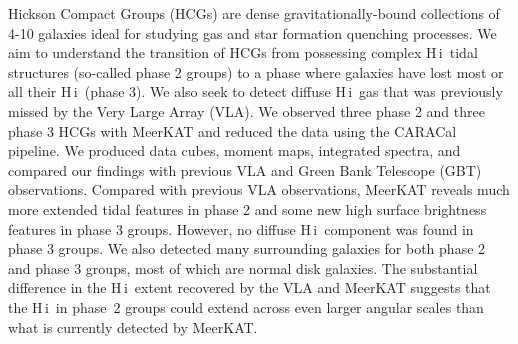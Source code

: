 \documentclass{aa}
\newcommand{\HI}{H\,{\sc i}}
\begin{document}
   \date{Received November 14, 2024; accepted December 16, 2024}

%
\abstract
{Hickson Compact Groups (HCGs) are dense gravitationally-bound collections of 4-10 galaxies ideal for studying gas and star formation quenching processes. }
{We aim to understand the transition of HCGs from possessing complex \HI\ tidal structures (so-called phase 2 groups) to a phase where galaxies have lost most or all their \HI\ (phase 3). We also seek to detect diffuse \HI\ gas that was previously missed by the Very Large Array (VLA).}
{We observed three phase 2 and three phase 3 HCGs with MeerKAT and reduced the data using the CARACal pipeline. We produced data cubes, moment maps, integrated spectra, and  compared our findings with previous VLA and Green Bank Telescope (GBT) observations.}
{Compared with previous VLA observations, MeerKAT reveals much more extended tidal features in phase 2 and some new high surface brightness features in phase 3 groups. However, no diffuse \HI\ component was found in phase 3 groups. We also detected many surrounding galaxies for both phase 2 and phase 3 groups, most of which are normal disk galaxies.}
{The substantial difference in the \HI\ extent recovered by the VLA and MeerKAT suggests that the \HI\ in phase~2 groups could extend across even larger angular scales than what is currently detected by MeerKAT.}


   \maketitle
%
\end{document}
